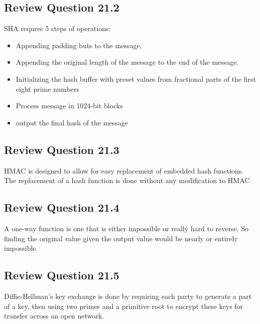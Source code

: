 \documentclass[14pt]{article}
\begin{document}
\subsection{Review Question 21.2}
  SHA requres 5 steps of operations:
  \begin{itemize}
  \item Appending padding buts to the message,
  \item Appending the original length of the message to the end of the message.
  \item Initializing the hash buffer with preset values from fractional parts of the first eight prime numbers
  \item Process message in 1024-bit blocks
  \item output the final hash of the message
  \end{itemize}
\subsection{Review Question 21.3}
HMAC is designed to allow for easy replacement of embedded hash functions. The replacement of a hash function is done without any modification to HMAC
\subsection{Review Question 21.4}
A one-way function is one that is either impossible or really hard to reverse. So finding the original value given the output value would be nearly or entirely impossible.
\subsection{Review Question 21.5}
Diffie-Hellman's key exchange is done by requiring each party to generate a part of a key, then using two primes and a primitive root to encrypt these keys for transfer across an open network.
\newpage



\end{document}
